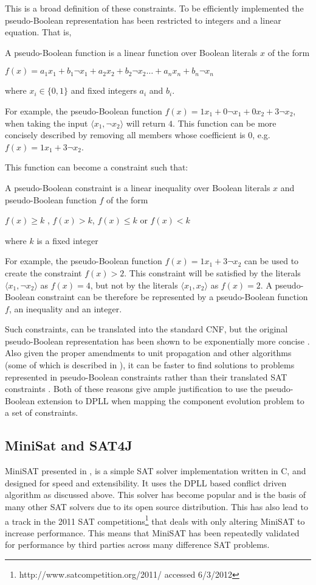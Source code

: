 This is a broad definition of these constraints.
To be efficiently implemented the pseudo-Boolean representation has been restricted to integers and a linear equation.
That is,
\begin{defs}
A pseudo-Boolean function is a linear function over Boolean literals $x$ of the form

$f(x) = a_1x_1 + b_1\neg x_1 + a_2x_2 + b_2\neg x_2 \ldots +  a_nx_n + b_n\neg x_n$

where $x_i \in \{0,1\}$ and fixed integers $a_i$ and $b_i$.
\end{defs}
For example, the pseudo-Boolean function $f(x) = 1x_1 + 0\neg x_1 + 0x_2 + 3\neg x_2$, when taking the input $\langle x_1, \neg x_2 \rangle$ will return $4$.
This function can be more concisely described by removing all members whose coefficient is $0$, e.g. $f(x) = 1x_1 + 3\neg x_2$.

This function can become a constraint such that:
\begin{defs}
A pseudo-Boolean constraint is a linear inequality over Boolean literals $x$ and pseudo-Boolean function $f$ of the form

$f(x) \geq k$ , $f(x) > k$, $f(x) \leq k$ or $f(x) < k$

where $k$ is a fixed integer
\end{defs}

For example, the pseudo-Boolean function $f(x) = 1x_1 + 3\neg x_2$ can be used to create the constraint $f(x) > 2$.
This constraint will be satisfied by the literals $\langle x_1, \neg x_2 \rangle$ as $f(x) = 4$, but not by the literals $\langle x_1,  x_2 \rangle$ as $f(x) = 2$.
A pseudo-Boolean constraint can be therefore be represented by a pseudo-Boolean function $f$, an inequality and an integer.

Such constraints, can be translated into the standard CNF, but the original pseudo-Boolean representation has been shown to be exponentially more concise \citep{dixon2004automating}.
Also given the proper amendments to unit propagation and other algorithms (some of which is described in \citep{Sheini2006}), 
it can be faster to find solutions to problems represented in pseudo-Boolean constraints rather than their translated SAT constraints \citep{dixon2004automating}.
Both of these reasons give ample justification to use the pseudo-Boolean extension to DPLL when mapping the component evolution problem to a set of constraints. 

\subsection{MiniSat and SAT4J}
MiniSAT presented in \citep{een2003}, is a simple SAT solver implementation written in C, and designed for speed and extensibility.
It uses the DPLL based conflict driven algorithm as discussed above.
This solver has become popular and is the basis of many other SAT solvers due to its open source distribution.
This has also lead to a track in the 2011 SAT competitions\footnote{http://www.satcompetition.org/2011/ accessed 6/3/2012} that deals with only altering MiniSAT to increase performance.
This means that MiniSAT has been repeatedly validated for performance by third parties across many difference SAT problems. 

